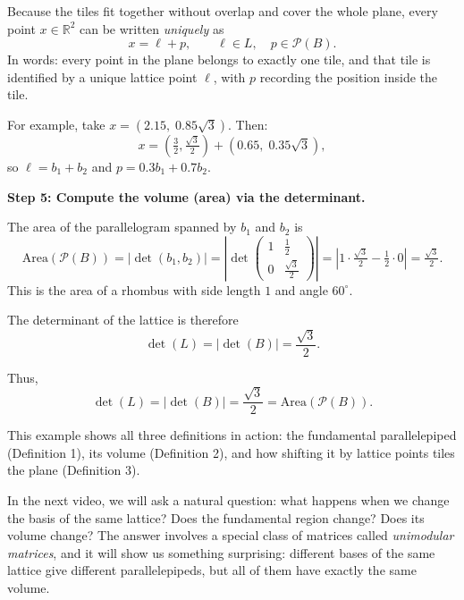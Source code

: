 \documentclass[11pt]{article}
\begin{document}
Because the tiles fit together without overlap and cover the whole plane, every point $x \in \mathbb{R}^2$ can be written \emph{uniquely} as
\[
x = \ell + p,
\qquad
\ell \in L,\quad p \in \mathcal{P}(B).
\]
In words: every point in the plane belongs to exactly one tile, and that tile is identified by a unique lattice point $\ell$, with $p$ recording the position inside the tile.

For example, take $x = (2.15,\; 0.85\sqrt{3})$. Then:
\[
x = \left(\tfrac32, \tfrac{\sqrt{3}}{2}\right) + (0.65,\; 0.35\sqrt{3}),
\]
so $\ell = b_1 + b_2$ and $p = 0.3b_1 + 0.7b_2$.

\medskip
\noindent
\textbf{Step 5: Compute the volume (area) via the determinant.}

The area of the parallelogram spanned by $b_1$ and $b_2$ is
\[
\text{Area}(\mathcal{P}(B)) = |\det(b_1, b_2)|
= \left| \det \begin{pmatrix} 1 & \tfrac12 \\ 0 & \tfrac{\sqrt{3}}{2} \end{pmatrix} \right|
= \left| 1 \cdot \tfrac{\sqrt{3}}{2} - \tfrac12 \cdot 0 \right|
= \tfrac{\sqrt{3}}{2}.
\]
This is the area of a rhombus with side length $1$ and angle $60^\circ$.

The determinant of the lattice is therefore
\[
\det(L) = |\det(B)| = \frac{\sqrt{3}}{2}.
\]

\medskip
\noindent
Thus,
\[
\boxed{\det(L) = |\det(B)| = \frac{\sqrt{3}}{2} = \text{Area}(\mathcal{P}(B)).}
\]

\medskip
\noindent
This example shows all three definitions in action: the fundamental parallelepiped (Definition 1), its volume (Definition 2), and how shifting it by lattice points tiles the plane (Definition 3).

\medskip
\noindent
In the next video, we will ask a natural question: what happens when we change the basis of the same lattice? Does the fundamental region change? Does its volume change? The answer involves a special class of matrices called \emph{unimodular matrices}, and it will show us something surprising: different bases of the same lattice give different parallelepipeds, but all of them have exactly the same volume.
\end{document}
